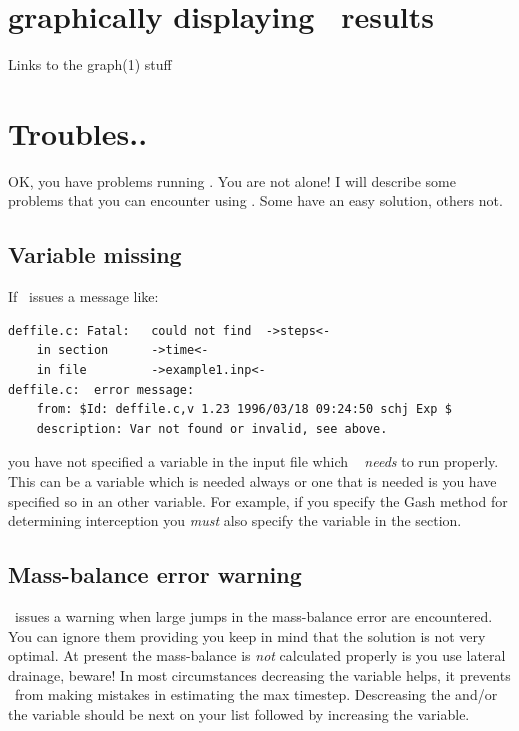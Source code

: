 \section{graphically displaying \vamps\ results}
Links to the graph(1) stuff


\section{Troubles..}\label{sec:troubles}
OK, you have problems running \vamps. You are not alone!
I will describe some problems that you can encounter
using \vamps. Some have an easy solution, others not.

\subsection{Variable missing}
If \vamps\ issues a message like:

\begin{verbatim}
deffile.c: Fatal:	could not find	->steps<-
	in section		->time<-
	in file			->example1.inp<-
deffile.c:	error message:
	from: $Id: deffile.c,v 1.23 1996/03/18 09:24:50 schj Exp $
	description: Var not found or invalid, see above.
\end{verbatim}

you have not specified a variable in the input file which \vamps\ {\em
needs} to run properly. This can be a variable which is needed always
or one that is needed is you have specified so in an other variable.
For example, if you specify the Gash method for determining interception
you {\em must} also specify the variable  in the 
section.


\subsection{Mass-balance error warning}

\vamps\ issues a warning when large jumps in the mass-balance error
are encountered. You can ignore them providing you keep in mind that
the solution is not very optimal. At present the mass-balance is {\em
not} calculated properly is you use lateral drainage, beware! In most
circumstances decreasing the  variable helps, it 
prevents \vamps\ from making mistakes in estimating the max timestep.
Descreasing the  and/or the  variable should
be next on your list followed by increasing the  variable.



